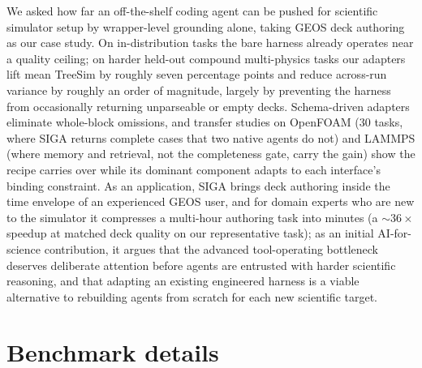 \documentclass{article}
\begin{document}
We asked how far an off-the-shelf coding agent can be pushed for scientific simulator setup by wrapper-level grounding alone, taking GEOS deck authoring as our case study. On in-distribution tasks the bare harness already operates near a quality ceiling; on harder held-out compound multi-physics tasks our adapters lift mean TreeSim by roughly seven percentage points and reduce across-run variance by roughly an order of magnitude, largely by preventing the harness from occasionally returning unparseable or empty decks. Schema-driven adapters eliminate whole-block omissions, and transfer studies on OpenFOAM (30 tasks, where SIGA returns complete cases that two native agents do not) and LAMMPS (where memory and retrieval, not the completeness gate, carry the gain) show the recipe carries over while its dominant component adapts to each interface's binding constraint. As an application, SIGA brings deck authoring inside the time envelope of an experienced GEOS user, and for domain experts who are new to the simulator it compresses a multi-hour authoring task into minutes (a ${\sim}36\times$ speedup at matched deck quality on our representative task); as an initial AI-for-science contribution, it argues that the advanced tool-operating bottleneck deserves deliberate attention before agents are entrusted with harder scientific reasoning, and that adapting an existing engineered harness is a viable alternative to rebuilding agents from scratch for each new scientific target.

\medskip

{
\small
}





\appendix

\section{Benchmark details}
\label{app:bench}
\end{document}
